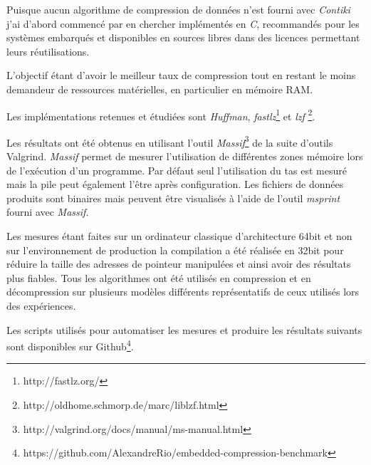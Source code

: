 Puisque aucun algorithme de compression de données n'est fourni avec \emph{Contiki} j'ai d'abord commencé par en chercher implémentés en \emph{C}, recommandés pour les systèmes embarqués et disponibles en sources libres dans des licences permettant leurs réutilisations.

L'objectif étant d'avoir le meilleur taux de compression tout en restant le moins demandeur de ressources matérielles, en particulier en mémoire RAM.

Les implémentations retenues et étudiées sont \emph{Huffman}, \emph{fastlz}\footnote{http://fastlz.org/} et \emph{lzf} \footnote{http://oldhome.schmorp.de/marc/liblzf.html}.

Les résultats ont été obtenus en utilisant l'outil \emph{Massif}\footnote{http://valgrind.org/docs/manual/ms-manual.html} de la suite d'outils Valgrind. \emph{Massif} permet de mesurer l'utilisation de différentes zones mémoire lors de l'exécution d'un programme. Par défaut seul l'utilisation du tas est mesuré mais la pile peut également l'être après configuration. Les fichiers de données produits sont binaires mais peuvent être visualisés à l'aide de l'outil \emph{msprint} fourni avec \emph{Massif}.

Les mesures étant faites sur un ordinateur classique d'architecture 64bit et non sur l'environnement de production la compilation a été réalisée en 32bit pour réduire la taille des adresses de pointeur manipulées et ainsi avoir des résultats plus fiables. Tous les algorithmes ont été utilisés en compression et en décompression sur plusieurs modèles différents représentatifs de ceux utilisés lors des expériences.

Les scripts utilisés pour automatiser les mesures et produire les résultats suivants sont disponibles sur Github\footnote{https://github.com/AlexandreRio/embedded-compression-benchmark}.

